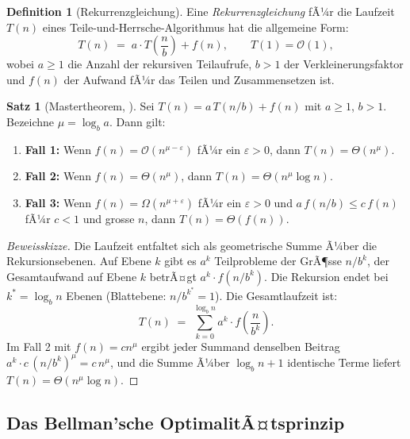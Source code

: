 ﻿\documentclass[a4paper,12pt]{article}
\theoremstyle{definition}
\newtheorem{definition}{Definition}
\newtheorem{satz}{Satz}
\begin{document}
\begin{definition}[Rekurrenzgleichung]
    Eine \emph{Rekurrenzgleichung} fÃ¼r die Laufzeit $T(n)$ eines
    Teile-und-Herrsche-Algorithmus hat die allgemeine Form:
    \[
        T(n) \;=\; a \cdot T\!\left(\frac{n}{b}\right) + f(n), \qquad T(1) = \mathcal{O}(1),
    \]
    wobei $a \geq 1$ die Anzahl der rekursiven Teilaufrufe, $b > 1$ der
    Verkleinerungsfaktor und $f(n)$ der Aufwand fÃ¼r das Teilen und Zusammensetzen ist.
\end{definition}

\begin{satz}[Mastertheorem, \cite{cormen2009}]
    \label{satz:master}
    Sei $T(n) = a\,T(n/b) + f(n)$ mit $a \geq 1$, $b > 1$.
    Bezeichne $\mu = \log_b a$. Dann gilt:
    \begin{enumerate}
        \item \textbf{Fall 1:} Wenn $f(n) = \mathcal{O}(n^{\mu - \varepsilon})$ fÃ¼r
              ein $\varepsilon > 0$, dann $T(n) = \Theta(n^\mu)$.
        \item \textbf{Fall 2:} Wenn $f(n) = \Theta(n^\mu)$, dann
              $T(n) = \Theta(n^\mu \log n)$.
        \item \textbf{Fall 3:} Wenn $f(n) = \Omega(n^{\mu + \varepsilon})$ fÃ¼r
              ein $\varepsilon > 0$ und $a\,f(n/b) \leq c\,f(n)$ fÃ¼r $c < 1$
              und grosse $n$, dann $T(n) = \Theta(f(n))$.
    \end{enumerate}
\end{satz}

\begin{proof}[Beweisskizze]
    Die Laufzeit entfaltet sich als geometrische Summe Ã¼ber die Rekursionsebenen.
    Auf Ebene $k$ gibt es $a^k$ Teilprobleme der GrÃ¶sse $n/b^k$, der Gesamtaufwand
    auf Ebene $k$ betrÃ¤gt $a^k \cdot f(n/b^k)$. Die Rekursion endet bei
    $k^* = \log_b n$ Ebenen (Blattebene: $n/b^{k^*} = 1$). Die Gesamtlaufzeit ist:
    \[
        T(n) \;=\; \sum_{k=0}^{\log_b n} a^k \cdot f\!\left(\frac{n}{b^k}\right).
    \]
    Im Fall 2 mit $f(n) = cn^\mu$ ergibt jeder Summand denselben Beitrag
    $a^k \cdot c\,(n/b^k)^\mu = c\,n^\mu$, und die Summe Ã¼ber $\log_b n + 1$
    identische Terme liefert $T(n) = \Theta(n^\mu \log n)$. \qedhere
\end{proof}

\subsection{Das Bellman'sche OptimalitÃ¤tsprinzip}
\end{document}
